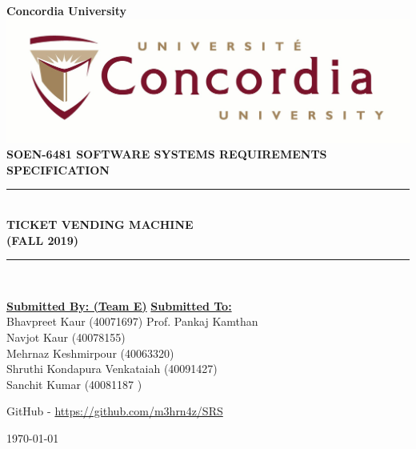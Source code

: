 \documentclass[a4paper,12pt]{report}
\newcommand{\TermName}{FALL 2019}
\newcommand{\Course}{\textbf{SOEN-6481 \vspace{0.5cm} SOFTWARE SYSTEMS REQUIREMENTS SPECIFICATION}}
\begin{document}

\begin{titlepage}
\newcommand{\HRule}{\rule{\linewidth}{0.5mm}} %


\centering
\textbf{\LARGE  Concordia University} \\ [5mm] 
\includegraphics[scale=.1]{University_logo.jpg}\\[1cm] 
\textsc{\Large \Course} \\ [0.5cm]

	
\HRule \\[0.4cm]
{ \huge \bfseries TICKET VENDING MACHINE \\ [5mm]  (\TermName)}\\[0.4cm] 
\HRule \\[1.5cm]


\vspace{4cm}

\begin{flushleft}


\textbf{\underline{\Large Submitted By: (Team E)}}
\hfill
\textbf{\underline{\Large Submitted To:}} \\
\vspace{3mm}
\large Bhavpreet Kaur (40071697)
\hfill
\large Prof. Pankaj Kamthan \\

\large Navjot Kaur (40078155) \hfill \\
\large Mehrnaz Keshmirpour (40063320) \hfill \\
\large Shruthi Kondapura Venkataiah (40091427) \hfill \\
\large Sanchit Kumar (40081187	) \\

\end{flushleft}

\centering \vspace{0.5cm}

GitHub - \href{https://github.com/m3hrn4z/SRS}{https://github.com/m3hrn4z/SRS}

\vspace{0.1cm}
{\large \today}\\[2cm]

\vfill
\end{titlepage}
\end{document}
